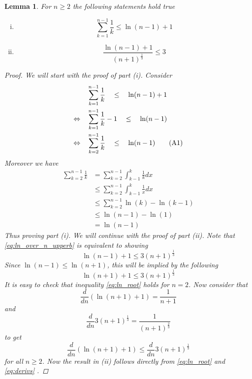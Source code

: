 \documentclass[phd]{UWMThesis}
\newcommand\numberthis{\addtocounter{equation}{1}\tag{\theequation}}
\renewcommand{\.}{\textrm{ .}}
\newtheorem{lemma}[thm]{Lemma}
\theoremstyle{definition}
\numberwithin{thm}{chapter}
\begin{document}
	\begin{lemma} \label{lem:bounds}
		For $n\geq 2$ the following statements hold true
		\begin{enumerate}[(i)]
			\item \begin{equation}
			\sum_{k=1}^{n-1} \frac{1}{k} \leq \ln(n-1) + 1
			\label{eq:sum_ln}
			\end{equation}
			\item \begin{equation}
			\frac{\ln(n-1)+1}{(n+1)^{\frac{1}{3}}} \leq 3
			\label{eq:ln_over_n_upperb}
			\end{equation}
		\end{enumerate}
		\begin{proof}
			We will start with the proof of part (i). Consider 
			\begin{align*}
			& \quad\sum_{k=1}^{n-1} \frac{1}{k} \quad \leq \quad  \ln(n-1) + 1 \\
			\Leftrightarrow & \quad \sum_{k=1}^{n-1} \frac{1}{k} - 1 \quad \leq \quad  \ln(n-1)\\
			\Leftrightarrow & \quad \sum_{k=2}^{n-1} \frac{1}{k} \quad \leq \quad  \ln(n-1)
			\numberthis\label{eq:prodexp}
			\end{align*}
			Moreover we have
			\begin{align*}
			\sum_{k=2}^{n-1} \frac{1}{k} &= \sum_{k=2}^{n-1} \int_{k-1}^{k}\frac{1}{k} dx\\
			&\leq \sum_{k=2}^{n-1} \int_{k-1}^{k}\frac{1}{x} dx\\
			&\leq \sum_{k=2}^{n-1} \ln(k) - \ln(k-1)\\
			&\leq \ln(n-1) - \ln(1)\\
			&= \ln(n-1)
			\end{align*}
			Thus proving part (i). 
			We will continue with the proof of part (ii). Note that \eqref{eq:ln_over_n_upperb} is equivalent to showing 
			\begin{equation*}
			\ln(n-1)+1 \leq 3(n+1)^{\frac{1}{3}}
			\end{equation*}
			Since $\ln(n-1)\leq \ln(n+1)$, this will be implied by the following
			\begin{equation}
			\ln(n+1)+1 \leq 3(n+1)^{\frac{1}{3}}
			\label{eq:ln_root}
			\end{equation}
			It is easy to check that inequality \eqref{eq:ln_root} holds for $n=2$. Now consider that 
			$$\frac{d}{dn}(\ln(n+1)+1) = \frac{1}{n+1}$$
			and
			$$\frac{d}{dn} 3(n+1)^\frac{1}{3} = \frac{1}{(n+1)^\frac{2}{3}}$$
			to get
			\begin{equation}
			\frac{d}{dn}(\ln(n+1)+1) \leq \frac{d}{dn} 3(n+1)^\frac{1}{3}
			\label{eq:derivs}
			\end{equation}	
			for all $n\geq 2$. Now the result in (ii) follows directly from \eqref{eq:ln_root} and \eqref{eq:derivs} .
		\end{proof}
	\end{lemma}
\end{document}
